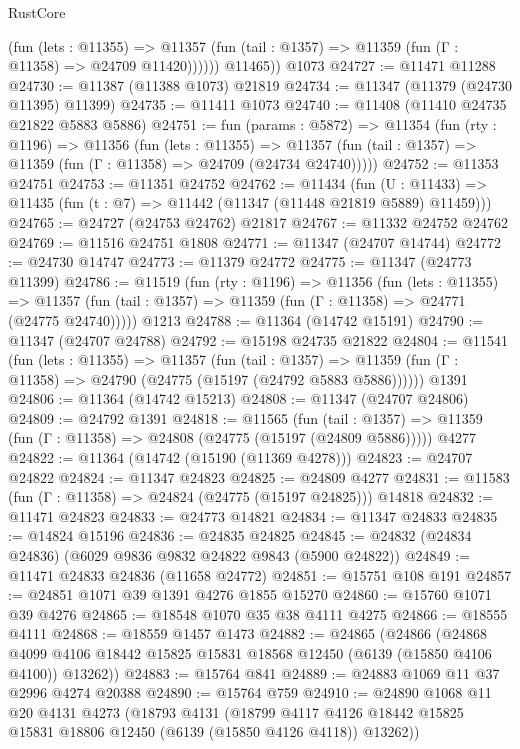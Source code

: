 \begin{lexlean}{RustCore}
\begin{coremodule}
              (fun (lets : @11355) =>
              @11357 (fun (tail : @1357) => @11359 (fun (Γ : @11358) => @24709 @11420))))))
        @11465))
    @1073
@24727 := @11471 @11288
@24730 := @11387 (@11388 @1073) @21819
@24734 := @11347 (@11379 (@24730 @11395) @11399)
@24735 := @11411 @1073
@24740 := @11408 (@11410 @24735 @21822 @5883 @5886)
@24751 := fun (params : @5872) =>
  @11354
    (fun (rty : @1196) =>
    @11356
      (fun (lets : @11355) =>
      @11357 (fun (tail : @1357) => @11359 (fun (Γ : @11358) => @24709 (@24734 @24740)))))
@24752 := @11353 @24751
@24753 := @11351 @24752
@24762 := @11434
    (fun (U : @11433) => @11435 (fun (t : @7) => @11442 (@11347 (@11448 @21819 @5889) @11459)))
@24765 := @24727 (@24753 @24762) @21817
@24767 := @11332 @24752 @24762
@24769 := @11516 @24751 @1808
@24771 := @11347 (@24707 @14744)
@24772 := @24730 @14747
@24773 := @11379 @24772
@24775 := @11347 (@24773 @11399)
@24786 := @11519
    (fun (rty : @1196) =>
    @11356
      (fun (lets : @11355) =>
      @11357 (fun (tail : @1357) => @11359 (fun (Γ : @11358) => @24771 (@24775 @24740)))))
    @1213
@24788 := @11364 (@14742 @15191)
@24790 := @11347 (@24707 @24788)
@24792 := @15198 @24735 @21822
@24804 := @11541
    (fun (lets : @11355) =>
    @11357
      (fun (tail : @1357) =>
      @11359 (fun (Γ : @11358) => @24790 (@24775 (@15197 (@24792 @5883 @5886))))))
    @1391
@24806 := @11364 (@14742 @15213)
@24808 := @11347 (@24707 @24806)
@24809 := @24792 @1391
@24818 := @11565
    (fun (tail : @1357) => @11359 (fun (Γ : @11358) => @24808 (@24775 (@15197 (@24809 @5886)))))
    @4277
@24822 := @11364 (@14742 (@15190 (@11369 @4278)))
@24823 := @24707 @24822
@24824 := @11347 @24823
@24825 := @24809 @4277
@24831 := @11583 (fun (Γ : @11358) => @24824 (@24775 (@15197 @24825))) @14818
@24832 := @11471 @24823
@24833 := @24773 @14821
@24834 := @11347 @24833
@24835 := @14824 @15196
@24836 := @24835 @24825
@24845 := @24832 (@24834 @24836) (@6029 @9836 @9832 @24822 @9843 (@5900 @24822))
@24849 := @11471 @24833 @24836 (@11658 @24772)
@24851 := @15751 @108 @191
@24857 := @24851 @1071 @39 @1391 @4276 @1855 @15270
@24860 := @15760 @1071 @39 @4276
@24865 := @18548 @1070 @35 @38 @4111 @4275
@24866 := @18555 @4111
@24868 := @18559 @1457 @1473
@24882 := @24865
    (@24866
      (@24868 @4099 @4106 @18442 @15825 @15831 @18568 @12450 (@6139 (@15850 @4106 @4100)) @13262))
@24883 := @15764 @841
@24889 := @24883 @1069 @11 @37 @2996 @4274 @20388
@24890 := @15764 @759
@24910 := @24890
    @1068
    @11
    @20
    @4131
    @4273
    (@18793
      @4131
      (@18799 @4117 @4126 @18442 @15825 @15831 @18806 @12450 (@6139 (@15850 @4126 @4118)) @13262))

\end{coremodule}
\end{lexlean}
